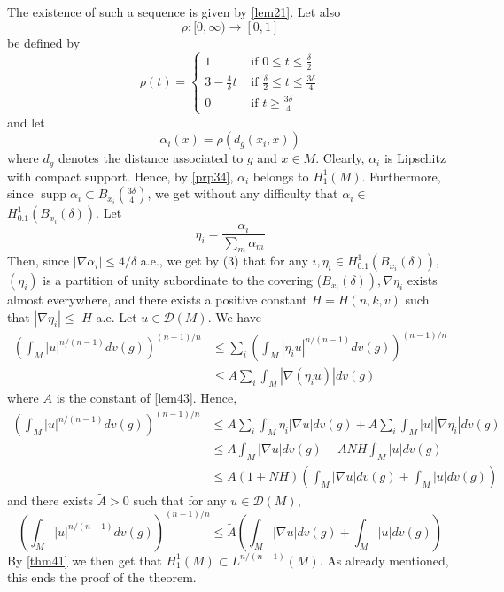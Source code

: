 \documentclass[12pt,hyperref,a4paper,UTF8]{ctexart}
\begin{document}
\begin{Proof2}
\vskip 3pt
\noindent
The existence of such a sequence is given by \autoref{lem21}. Let also
$$
\rho:[0, \infty) \rightarrow[0,1]
$$
be defined by
$$
\rho(t)=\left\{\begin{array}{ll}
1 & \text { if } 0 \leq t \leq \frac{\delta}{2} \\
3-\frac{4}{\delta} t & \text { if } \frac{\delta}{2} \leq t \leq \frac{3 \delta}{4} \\
0 & \text { if } t \geq \frac{3 \delta}{4}
\end{array}\right.
$$
and let
$$
\alpha_i(x)=\rho\left(d_g\left(x_i, x\right)\right)
$$
where $d_g$ denotes the distance associated to $g$ and $x \in M$. Clearly, $\alpha_i$ is Lipschitz with compact support. Hence, by \autoref{prp34}, $\alpha_i$ belongs to $H_1^1(M)$. Furthermore, since $\operatorname{supp} \alpha_i \subset B_{x_i}\left(\frac{3 \delta}{4}\right)$, we get without any difficulty that $\alpha_i \in$ $H_{0.1}^1\left(B_{x_i}(\delta)\right)$. Let
$$
\eta_i=\frac{\alpha_i}{\sum_m \alpha_m}
$$
Then, since $\left|\nabla \alpha_i\right| \leq 4 / \delta$ a.e., we get by (3) that for any $i, \eta_i \in H_{0.1}^1\left(B_{x_i}(\delta)\right)$, $\left(\eta_i\right)$ is a partition of unity subordinate to the covering ($\left.B_{x_i}(\delta)\right), \nabla \eta_i$ exists almost everywhere, and there exists a positive constant $H=H(n, k, v)$ such that $\left|\nabla \eta_i\right| \leq$ $H$ a.e. Let $u \in \mathcal{D}(M)$. We have
$$
\begin{aligned}
\left(\int_M|u|^{n /(n-1)} d v(g)\right)^{(n-1) / n} & \leq \sum_i\left(\int_M\left|\eta_i u\right|^{n /(n-1)} d v(g)\right)^{(n-1) / n} \\
& \leq A \sum_i \int_M\left|\nabla\left(\eta_i u\right)\right| d v(g)
\end{aligned}
$$
where $A$ is the constant of \autoref{lem43}. Hence,
$$
\begin{aligned}
\left(\int_M|u|^{n /(n-1)} d v(g)\right)^{(n-1) / n} &\leq A \sum_i \int_M \eta_i|\nabla u| d v(g)+A \sum_i \int_M|u|\left|\nabla \eta_i\right| d v(g) \\
&\leq A \int_M|\nabla u| d v(g)+A N H \int_M|u| d v(g) \\
&\leq A(1+N H)\left(\int_M|\nabla u| d v(g)+\int_M|u| d v(g)\right)
\end{aligned}
$$
and there exists $\tilde{A}>0$ such that for any $u \in \mathcal{D}(M)$,
$$
\left(\int_M|u|^{n /(n-1)} d v(g)\right)^{(n-1) / n} \leq \tilde{A}\left(\int_M|\nabla u| d v(g)+\int_M|u| d v(g)\right)
$$
By \autoref{thm41} we then get that $H_1^1(M) \subset L^{n /(n-1)}(M)$. As already mentioned, this ends the proof of the theorem.
\end{Proof2}
\end{document}
